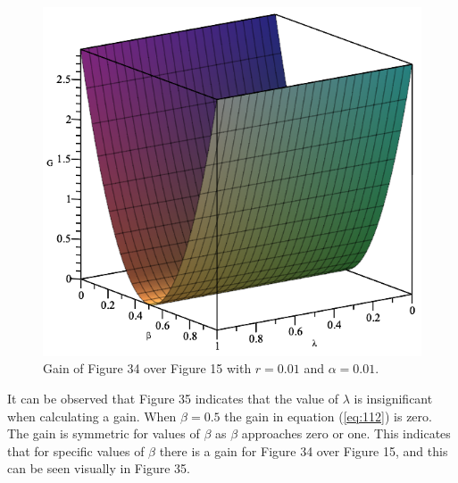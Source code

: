 \documentclass[twocolumn]{article}
\begin{document}
\begin{figure}[h]
\begin{center}
\includegraphics[width=0.65\linewidth]{Phase-Flip-Triple-Channel-r=001-Alpha=001-Gain-Graph.png}
\caption{Gain of Figure 34 over Figure 15 with $r=0.01$ and $\alpha=0.01$.}
\end{center}
\end{figure}
\newline
It can be observed that Figure 35 indicates that the value of $\lambda$ is insignificant when calculating a gain. When $\beta=0.5$ the gain in equation (\ref{eq:112}) is zero. The gain is symmetric for values of $\beta$ as $\beta$ approaches zero or one. This indicates that for specific values of $\beta$ there is a gain for Figure 34 over Figure 15, and this can be seen visually in Figure 35.
\end{document}
